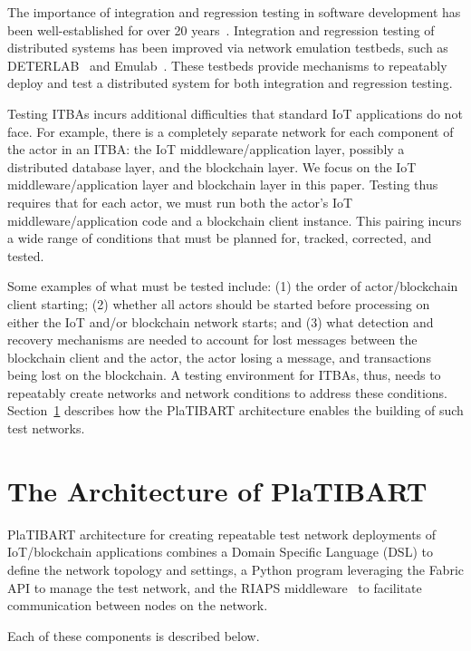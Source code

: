 The importance of integration and regression testing in software development has been well-established for over 20 years~\cite{rothermel2001prioritizing,agrawal1993incremental,leung1990study}. Integration and regression testing of distributed systems has been improved via network emulation testbeds, such as DETERLAB~\cite{mirkovic2012teachingDETERLAB} and Emulab~\cite{siaterlis2013useEmulab}. These testbeds provide mechanisms to repeatably deploy and test a distributed system for both integration and regression testing.

Testing ITBAs incurs additional difficulties that standard IoT applications do not face. For example, there is a completely separate network for each component of the actor in an ITBA: the IoT middleware/application layer, possibly a distributed database layer, and the blockchain layer.  We focus on the IoT middleware/application layer and blockchain layer in this paper. Testing thus requires that for each actor, we must run both the actor's IoT middleware/application code and a blockchain client instance. This pairing incurs a wide range of conditions that must be planned for, tracked, corrected, and tested. 

Some examples of what must be tested include: (1) the order of actor/blockchain client starting; (2) whether all actors should be started before processing on either the IoT and/or blockchain network starts; and (3) what detection and recovery mechanisms are needed to account for lost messages between the blockchain client and the actor, the actor losing a message, and transactions being lost on the blockchain. A testing environment for ITBAs, thus, needs to repeatably create networks and network conditions to address these conditions. Section~\ref{proposedArch} describes how the PlaTIBART architecture enables the building of such test networks. 


\section{The Architecture of PlaTIBART}
\label{proposedArch}

PlaTIBART architecture for creating repeatable test network deployments of IoT/blockchain applications combines a Domain Specific Language (DSL) to define the network topology and settings, a Python program leveraging the Fabric API to manage the test network, and the RIAPS middleware~\cite{RIAPS_IEEE_ISORC_2017} to facilitate communication between nodes on the network. 
\iffalse
PlaTIBART's DSL is textual and uses the JSON formatting for notation. The network manager application leverages the usage of SSH via the Python Fabric API to allow remote management of potentially multiple nodes on each host in the network. The RIAPS middleware provides each node on the network the off-blockchain communication mechanism to communicate with other nodes and contains the application logic for each node. 
\fi
Each of these components is described below.

